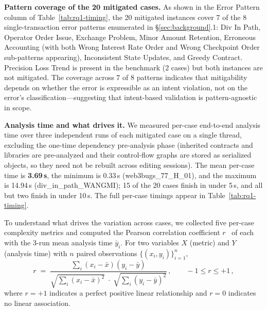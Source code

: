 \documentclass[pdflatex,sn-basic]{sn-jnl}%
\theoremstyle{thmstyleone}%
\theoremstyle{thmstyletwo}%
\theoremstyle{thmstylethree}%
\begin{document}
\smallskip
\noindent\textbf{Pattern coverage of the 20 mitigated cases.}
As shown in the Error Pattern column of Table~\ref{tab:rq1-timing}, the 20 mitigated instances cover 7 of the 8 single-transaction error patterns enumerated in §\ref{sec:background}.1: Div In Path, Operator Order Issue, Exchange Problem, Minor Amount Retention, Erroneous Accounting (with both Wrong Interest Rate Order and Wrong Checkpoint Order sub-patterns appearing), Inconsistent State Updates, and Greedy Contract.
Precision Loss Trend is present in the benchmark (2 cases) but both instances are not mitigated.
The coverage across 7 of 8 patterns indicates that mitigability depends on whether the error is expressible as an intent violation, not on the error's classification---suggesting that intent-based validation is pattern-agnostic in scope.

\smallskip
\noindent\textbf{Analysis time and what drives it.}
We measured per-case end-to-end analysis time over three independent runs of each mitigated case on a single thread, excluding the one-time dependency pre-analysis phase (inherited contracts and libraries are pre-analyzed and their control-flow graphs are stored as serialized objects, so they need not be rebuilt across editing sessions).
The mean per-case time is \textbf{3.69\,s}, the minimum is 0.33\,s (web3bugs\_77\_H\_01), and the maximum is 14.94\,s (div\_in\_path\_WANGMI); 15 of the 20 cases finish in under 5\,s, and all but two finish in under 10\,s.
The full per-case timings appear in Table~\ref{tab:rq1-timing}.

To understand what drives the variation across cases, we collected five per-case complexity metrics and computed the Pearson correlation coefficient $r$~\citep{pearson_r} of each with the 3-run mean analysis time $\bar{y}_i$.
For two variables $X$ (metric) and $Y$ (analysis time) with $n$ paired observations $\{(x_i,y_i)\}_{i=1}^{n}$,
\[
  r \;=\; \frac{\sum_{i}(x_i-\bar{x})(y_i-\bar{y})}
               {\sqrt{\sum_{i}(x_i-\bar{x})^{2}}\;\cdot\;\sqrt{\sum_{i}(y_i-\bar{y})^{2}}}\,,
  \qquad -1 \le r \le +1\,,
\]
where $r=+1$ indicates a perfect positive linear relationship and $r=0$ indicates no linear association.
\end{document}
